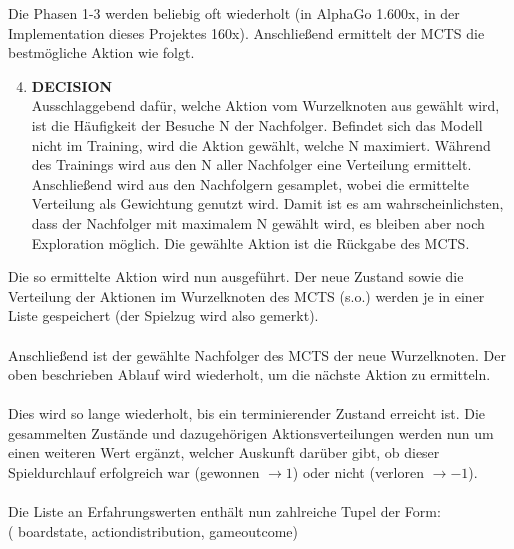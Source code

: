 	Die Phasen 1-3 werden beliebig oft wiederholt (in AlphaGo 1.600x, in der Implementation dieses Projektes 160x). Anschließend ermittelt der MCTS die bestmögliche Aktion wie folgt.
\begin{enumerate}\setcounter{enumi}{3}
	\item \textbf{DECISION}\\
	Ausschlaggebend dafür, welche Aktion vom Wurzelknoten aus gewählt wird, ist die Häufigkeit der Besuche N der Nachfolger. 
	Befindet sich das Modell nicht im Training, wird die Aktion gewählt, welche N maximiert.
	Während des Trainings wird aus den N aller Nachfolger eine Verteilung ermittelt. Anschließend wird aus den Nachfolgern gesamplet, wobei die ermittelte Verteilung als Gewichtung genutzt wird. Damit ist es am wahrscheinlichsten, dass der Nachfolger mit maximalem N gewählt wird, es bleiben aber noch Exploration möglich.
	Die gewählte Aktion ist die Rückgabe des MCTS.
\end{enumerate}
Die so ermittelte Aktion wird nun ausgeführt. Der neue Zustand sowie die Verteilung der Aktionen im Wurzelknoten des MCTS (s.o.) werden je in einer Liste gespeichert (der Spielzug wird also gemerkt).
\\\\
Anschließend ist der gewählte Nachfolger des MCTS der neue Wurzelknoten. Der oben beschrieben Ablauf wird wiederholt, um die nächste Aktion zu ermitteln.
\\\\
Dies wird so lange wiederholt, bis ein terminierender Zustand erreicht ist. Die gesammelten Zustände und dazugehörigen Aktionsverteilungen werden nun um einen weiteren Wert ergänzt, welcher Auskunft darüber gibt, ob dieser Spieldurchlauf erfolgreich war (gewonnen $\rightarrow 1$) oder nicht (verloren $\rightarrow -1$).
\\\\
Die Liste an Erfahrungswerten enthält nun zahlreiche Tupel der Form:\\
( board\textunderscore{}state, action\textunderscore{}distribution, game\textunderscore{}outcome)


